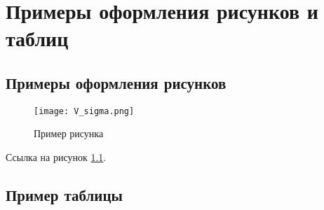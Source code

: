 \newpage
\chapter{Примеры оформления рисунков и таблиц}

\section{Примеры оформления рисунков}

\begin{figure}[h!]\label{pic:2picture2}
\texttt{[image: V\_sigma.png]}
\caption{Пример рисунка}
\label{pic1}
\end{figure}

Ссылка на рисунок \ref{pic1}.

\section{Пример таблицы}

